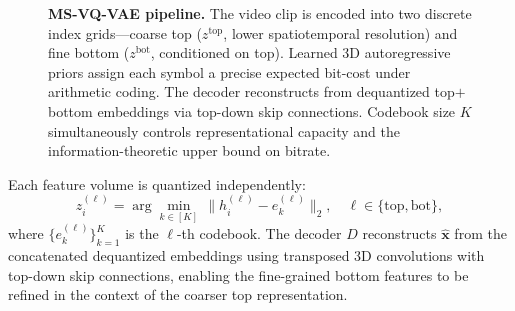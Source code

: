 \documentclass{article}
\newcommand{\model}{\textsc{MS-VQ-VAE}}
\begin{document}
\begin{figure}[t]
\caption{%
  \textbf{\model{} pipeline.}
  The video clip is encoded into two discrete index grids---coarse top
  ($z^{\mathrm{top}}$, lower spatiotemporal resolution) and fine bottom
  ($z^{\mathrm{bot}}$, conditioned on top).
  Learned 3D autoregressive priors assign each symbol a precise expected
  bit-cost under arithmetic coding.
  The decoder reconstructs from dequantized top$+$bottom embeddings via
  top-down skip connections.
  Codebook size $K$ simultaneously controls representational capacity and
  the information-theoretic upper bound on bitrate.
}
\label{fig:arch}
\end{figure}

Each feature volume is quantized independently:
\begin{equation}
  z^{(\ell)}_i = \arg\min_{k\in[K]}\,
    \bigl\| h^{(\ell)}_i - e^{(\ell)}_k \bigr\|_2,
  \quad \ell \in \{\mathrm{top},\mathrm{bot}\},
\label{eq:vq}
\end{equation}
where $\{e^{(\ell)}_k\}_{k=1}^K$ is the $\ell$-th codebook.
The decoder $D$ reconstructs $\hat{\mathbf{x}}$ from the concatenated
dequantized embeddings using transposed 3D convolutions with top-down
skip connections, enabling the fine-grained bottom features to be refined
in the context of the coarser top representation.
\end{document}
